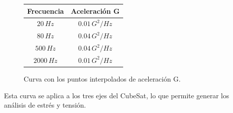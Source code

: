       \begin{figure}[!ht]
        \centering
        \begin{minipage}{0.4\textwidth}
          \centering
          \begin{tabular}{|c|c|}
            \hline
            Frecuencia & Aceleración G \\ \hline
            $20 \, Hz$ & $0.01 \, G^2/Hz$ \\ \hline
            $80 \, Hz$ & $0.04 \, G^2/Hz$ \\ \hline
            $500 \, Hz$ & $0.04 \, G^2/Hz$ \\ \hline
            $2000 \, Hz$ & $0.01 \, G^2/Hz$ \\ \hline
          \end{tabular}
          \label{tab:accel}
        \end{minipage}
        \hspace{0.05\textwidth}
        \begin{minipage}{0.4\textwidth}
          \caption{Curva con los puntos interpolados de aceleración G.}
          \label{fig:graph_accel}
        \end{minipage}
      \end{figure}

      Esta curva se aplica a los tres ejes del CubeSat, lo que permite generar los análisis de estrés y tensión.

